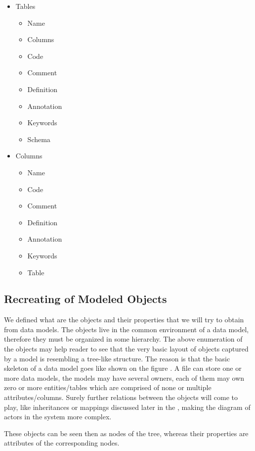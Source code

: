 \begin{itemize}
	\item Tables
	\begin{itemize}
		\item Name 
		\item Columns
		\item Code 
		\item Comment
		\item Definition
		\item Annotation
		\item Keywords
		\item Schema
	\end{itemize}
	\item Columns
	\begin{itemize}
		\item Name 
		\item Code 
		\item Comment
		\item Definition
		\item Annotation
		\item Keywords
		\item Table
	\end{itemize}
\end{itemize}

\subsection{Recreating of Modeled Objects}

We defined what are the objects and their properties that we will try to obtain from data models. 
The objects live in the common environment of a data model, therefore they must be organized in some hierarchy.
 The above enumeration of the objects may help reader to see that the very basic layout of objects captured by a model is resembling a tree-like structure. The reason is that the basic skeleton of a data model goes like shown on the figure . A file can store one or more data models, the models may have several owners, each of them may own zero or more entities/tables which are comprised of none or multiple attributes/columns. 
 Surely further relations between the objects will come to play, like inheritances or mappings discussed later in the , making the diagram of actors in the system more complex.
 
 These objects can be seen then as nodes of the tree, whereas their properties are attributes of the corresponding nodes.
 
